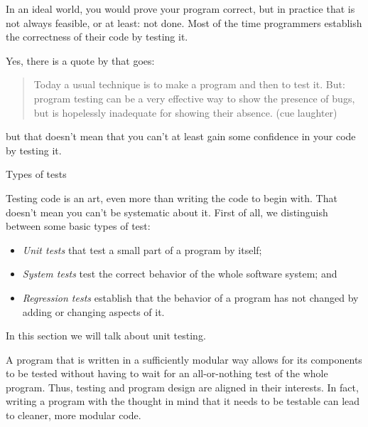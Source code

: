 
In an ideal world, you would prove your program correct,
but in practice that is not always feasible,
or at least: not done.
Most of the time programmers establish the correctness of their code
by testing it.

Yes, there is a quote by  that goes:
\begin{quotation}
  Today a usual technique is to make a program and then to test
  it. But: program testing can be a very effective way to show the
  presence of bugs, but is hopelessly inadequate for showing their
  absence. (cue laughter)
\end{quotation}
but that doesn't mean that you can't at least gain some confidence
in your code by testing it.

 {Types of tests}

Testing code is an art, even more than writing the code to begin with.
That doesn't mean you can't be systematic about it.
First of all, we distinguish between some basic types of test:
\begin{itemize}
\item \emph{Unit tests}
  that test a small part of a program by itself;
\item \emph{System tests}
  test the correct behavior of the whole software system; and
\item \emph{Regression tests}
  establish that the behavior of a program has not changed by adding or changing aspects of it.
\end{itemize}
In this section we will talk about unit testing.

A program that is written in a sufficiently  modular way
allows for its components to be tested
without having to wait for an all-or-nothing test of the whole program.
Thus, testing and program design are aligned in their interests.
In fact, writing a program with the thought in mind that it needs to be testable
can lead to cleaner, more modular code.

